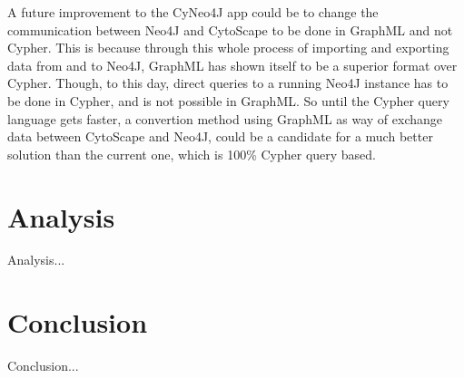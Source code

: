 \documentclass[UKenglish]{ifimaster}
\begin{document}
A future improvement to the CyNeo4J app could be to change the communication
between Neo4J and CytoScape to be done in GraphML and not Cypher. This is
because through this whole process of importing and exporting data from and to
Neo4J, GraphML has shown itself to be a superior format over Cypher. Though, to
this day, direct queries to a running Neo4J instance has to be done in Cypher,
and is not possible in GraphML. So until the Cypher query language gets faster,
a convertion method using GraphML as way of exchange data between CytoScape and
Neo4J, could be a candidate for a much better solution than the current one,
which is 100\% Cypher query based.

\part{Analysis}
Analysis...
\part{Conclusion}
Conclusion...
\backmatter{}
\printbibliography
\end{document}

